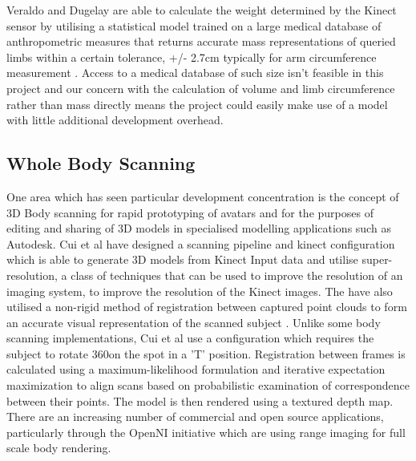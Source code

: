 Veraldo and Dugelay are able to calculate the weight determined by the Kinect sensor by utilising a statistical model trained on a large medical database of anthropometric measures that returns accurate mass representations of queried limbs within a certain tolerance, +/- 2.7cm typically for arm circumference measurement \cite{Paleria2011}. Access to a medical database of such size isn't feasible in this project and our concern with the calculation of volume and limb circumference rather than mass directly means the project could easily make use of a model with little additional development overhead. \\

\subsection{Whole Body Scanning}

One area which has seen particular development concentration is the concept of 3D Body scanning for rapid prototyping of avatars and for the purposes of editing and sharing of 3D models in specialised modelling applications such as Autodesk. Cui et al have designed a scanning pipeline and kinect configuration which is able to generate 3D models from Kinect Input data and utilise super-resolution, a class of techniques that can be used to improve the resolution of an imaging system, to improve the resolution of the Kinect images. The have also utilised a non-rigid method of registration between captured point clouds to form an accurate visual representation of the scanned subject \cite{Cui2012}. Unlike some body scanning implementations, Cui et al use a configuration which requires the subject to rotate 360\degree on the spot in a 'T' position. Registration between frames is calculated using a maximum-likelihood formulation and iterative expectation maximization to align scans based on probabilistic examination of correspondence between their points. The model is then rendered using a textured depth map. There are an increasing number of commercial and open source applications, particularly through the OpenNI \cite{openNi13} initiative which are using range imaging for full scale body rendering. \\
